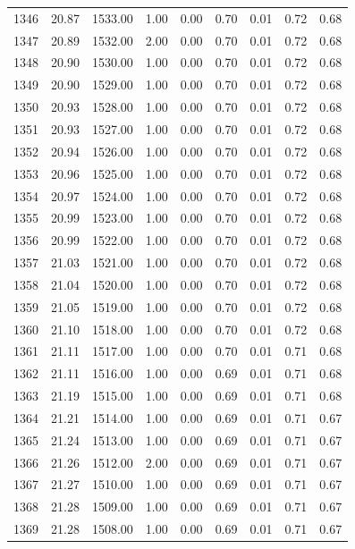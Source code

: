 \documentclass{article}\usepackage[]{graphicx}\usepackage[]{color}
\begin{document}
\begin{longtable}{rrrrrrrrr}
  1346 & 20.87 & 1533.00 & 1.00 & 0.00 & 0.70 & 0.01 & 0.72 & 0.68 \\ 
  1347 & 20.89 & 1532.00 & 2.00 & 0.00 & 0.70 & 0.01 & 0.72 & 0.68 \\ 
  1348 & 20.90 & 1530.00 & 1.00 & 0.00 & 0.70 & 0.01 & 0.72 & 0.68 \\ 
  1349 & 20.90 & 1529.00 & 1.00 & 0.00 & 0.70 & 0.01 & 0.72 & 0.68 \\ 
  1350 & 20.93 & 1528.00 & 1.00 & 0.00 & 0.70 & 0.01 & 0.72 & 0.68 \\ 
  1351 & 20.93 & 1527.00 & 1.00 & 0.00 & 0.70 & 0.01 & 0.72 & 0.68 \\ 
  1352 & 20.94 & 1526.00 & 1.00 & 0.00 & 0.70 & 0.01 & 0.72 & 0.68 \\ 
  1353 & 20.96 & 1525.00 & 1.00 & 0.00 & 0.70 & 0.01 & 0.72 & 0.68 \\ 
  1354 & 20.97 & 1524.00 & 1.00 & 0.00 & 0.70 & 0.01 & 0.72 & 0.68 \\ 
  1355 & 20.99 & 1523.00 & 1.00 & 0.00 & 0.70 & 0.01 & 0.72 & 0.68 \\ 
  1356 & 20.99 & 1522.00 & 1.00 & 0.00 & 0.70 & 0.01 & 0.72 & 0.68 \\ 
  1357 & 21.03 & 1521.00 & 1.00 & 0.00 & 0.70 & 0.01 & 0.72 & 0.68 \\ 
  1358 & 21.04 & 1520.00 & 1.00 & 0.00 & 0.70 & 0.01 & 0.72 & 0.68 \\ 
  1359 & 21.05 & 1519.00 & 1.00 & 0.00 & 0.70 & 0.01 & 0.72 & 0.68 \\ 
  1360 & 21.10 & 1518.00 & 1.00 & 0.00 & 0.70 & 0.01 & 0.72 & 0.68 \\ 
  1361 & 21.11 & 1517.00 & 1.00 & 0.00 & 0.70 & 0.01 & 0.71 & 0.68 \\ 
  1362 & 21.11 & 1516.00 & 1.00 & 0.00 & 0.69 & 0.01 & 0.71 & 0.68 \\ 
  1363 & 21.19 & 1515.00 & 1.00 & 0.00 & 0.69 & 0.01 & 0.71 & 0.68 \\ 
  1364 & 21.21 & 1514.00 & 1.00 & 0.00 & 0.69 & 0.01 & 0.71 & 0.67 \\ 
  1365 & 21.24 & 1513.00 & 1.00 & 0.00 & 0.69 & 0.01 & 0.71 & 0.67 \\ 
  1366 & 21.26 & 1512.00 & 2.00 & 0.00 & 0.69 & 0.01 & 0.71 & 0.67 \\ 
  1367 & 21.27 & 1510.00 & 1.00 & 0.00 & 0.69 & 0.01 & 0.71 & 0.67 \\ 
  1368 & 21.28 & 1509.00 & 1.00 & 0.00 & 0.69 & 0.01 & 0.71 & 0.67 \\ 
  1369 & 21.28 & 1508.00 & 1.00 & 0.00 & 0.69 & 0.01 & 0.71 & 0.67 \\ 

\end{longtable}
\end{document}
